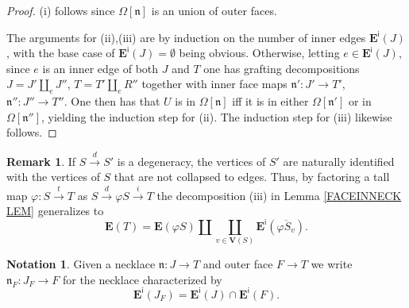 \documentclass[a4paper,10pt
,draft
]{article}%
\numberwithin{equation}{section}
\numberwithin{figure}{section}
\theoremstyle{definition} %
\newtheorem{remark}[equation]{Remark}%
\newtheorem{notation}[equation]{Notation}%
\newcommand{\1}{\ensuremath{\mathbbm 1}}%
\begin{document}
\begin{proof}
	(i) follows since $\Omega[\mathfrak{n}]$ is an union of outer faces.
	
	The arguments for (ii),(iii) are by induction on the number of inner edges $\boldsymbol{E}^{\mathsf{i}}(J)$,
	with the base case of $\boldsymbol{E}^{\mathsf{i}}(J) = \emptyset$  being obvious.
%	
	Otherwise, letting $e \in \boldsymbol{E}^{\mathsf{i}}(J)$, since $e$ is an inner edge of
	both $J$ and $T$
	one has grafting decompositions
	$J = J' \amalg_e J''$,
	$T = T' \amalg_e R''$
	together with inner face maps
	$\mathfrak{n}' \colon J' \to T'$,
	$\mathfrak{n}'' \colon J'' \to T''$.
%
	One then has that 
	$U$ is in $\Omega[\mathfrak{n}]$
	iff it is in either
	$\Omega[\mathfrak{n}']$ or in $\Omega[\mathfrak{n}'']$,
	yielding the induction step for (ii).
	The induction step for (iii) likewise follows. 
\end{proof}



\begin{remark}
	If $S \xrightarrow{d} S'$
	is a degeneracy,
	the vertices of $S'$ are naturally identified with
	the vertices of $S$ that are not collapsed to edges.
	Thus, by factoring a tall map
	$\varphi \colon S \xrightarrow{t} T$ as
	$S \xrightarrow{d} \varphi S \xrightarrow{i} T$
	the decomposition (iii) in Lemma \ref{FACEINNECK LEM}
	generalizes to 
\begin{equation}\label{EDGEBREAK EQ}
	\boldsymbol{E}(T) = 
	\boldsymbol{E}(\varphi S) \amalg 
	\coprod_{v \in \boldsymbol{V}(S)}
	\boldsymbol{E}^{\mathsf{i}}(\overline{\varphi S_v}).
\end{equation}
\end{remark}



\begin{notation}\label{JFNOT NOT}
	Given a necklace
	$\mathfrak{n} \colon J \to T$
	and outer face $F \to T$
	we write 
	$\mathfrak{n}_F \colon J_F \to F$
	for the necklace characterized by
\[
	\boldsymbol{E}^{\mathsf{i}}(J_F)
	=
	\boldsymbol{E}^{\mathsf{i}}(J)
	\cap
	\boldsymbol{E}^{\mathsf{i}}(F).
\]
\end{notation}
\end{document}
